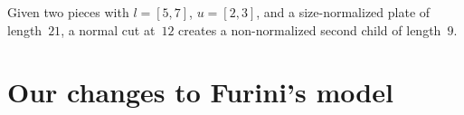 \documentclass[smallextended]{svjour3}       %
\begin{document}


\begin{example}
Given two pieces with \(l = [5, 7]\), \(u = [2, 3]\), and a size-normalized plate of length~\(21\), a normal cut at~\(12\) creates a non-normalized second child of length~\(9\). %
\end{example}

\begin{comment}
\subsection{Expanded example for thesis proposal}

I need an original plate and about 3~5 pieces.
Ideally the original plate should already be size-normalized, to be fair.
The smallest piece needs to be distant of one in absolute terms, but cannot be on the relatively large side, because this makes harder for an intermediary plate have many replacements.
We may use only squares, but this is kinda boring.
Probably the easiest way is to make a branch of the code in which the code enumerating plates saves which non-normalized plates were replaced by each normalized plate and outputs them.
\end{comment}

\section{Our changes to Furini's model}
\label{sec:enhanced_model}

\end{document}
